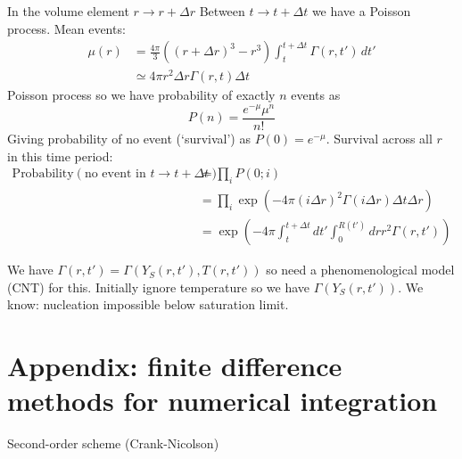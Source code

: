 \documentclass[12pt]{report}
\begin{document}
In the volume element $r \to r + \Delta r$ Between $t \to t+\Delta t$ we have a Poisson process.
Mean events:
\begin{equation}
  \begin{aligned}
    \mu(r) &= \frac{4\pi}{3} ( (r+\Delta r)^3 - r^3)
    \int_t^{t+\Delta t} \Gamma(r,t') \, dt' \\
    &\simeq
    4\pi r^2 \Delta r \Gamma(r, t) \Delta t
  \end{aligned}
\end{equation}
Poisson process so we have probability of exactly $n$ events as
\begin{equation}
  P(n) = \frac{e^{-\mu} \mu^n}{n!}
\end{equation}
Giving probability of no event (`survival') as $P(0) = e^{-\mu}$.
Survival across all $r$ in this time period:
\begin{equation}
  \begin{aligned}
  \textrm{Probability}\left( \textrm{no event in } t \to t + \Delta t \right)
  &= \prod_i P(0;i) \\
  &= \prod_i \exp{\left(-4\pi (i\Delta r)^2 \Gamma(i\Delta r) \Delta t \Delta r\right)} \\
  &= \exp{\left(
    -4\pi \int_t^{t+\Delta t} dt' \int_0^{R(t')} dr r^2 \Gamma(r, t')
    \right)}
  \end{aligned}
\end{equation}

We have $\Gamma(r,t') = \Gamma(Y_S(r,t'), T(r,t'))$ so need a phenomenological model (CNT) for this.
Initially ignore temperature so we have $\Gamma(Y_S(r,t'))$.
We know: nucleation impossible below saturation limit.

\section{Appendix: finite difference methods for numerical integration}
Second-order scheme (Crank-Nicolson)
\end{document}
